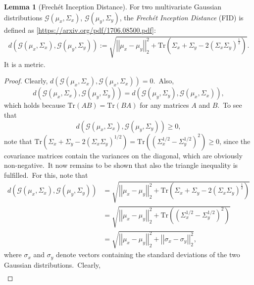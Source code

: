 \documentclass[12pt, a4paper]{article}
\numberwithin{equation}{section}
\theoremstyle{definition}
\theoremstyle{definition}
\newtheorem{lemma}[thm]{Lemma} %
\begin{document}
	\begin{lemma}[Frechét Inception Distance]
		For two multivariate Gaussian distributions $\mathcal G(\mu_{x}, \Sigma_{x})$, $\mathcal G(\mu_{y}, \Sigma_{y})$, the \textit{Frechét Inception Distance} (FID) is defined as [\url{https://arxiv.org/pdf/1706.08500.pdf}]: 
		\begin{align}
			d\left(\mathcal G(\mu_{x}, \Sigma_{x}), \mathcal G(\mu_{y}, \Sigma_{y})\right) := \sqrt{\left\vert\left\vert \mu_{x} - \mu_{y} \right\vert\right\vert_{2}^{2} + \text{Tr}\left(\Sigma_{x} + \Sigma_{y} - 2\left(\Sigma_{x}\Sigma_{y}\right)^{\frac{1}{2}}\right)}. 
		\end{align}
		It is a metric.\
	\end{lemma}
	\begin{proof}
		Clearly, $d\left(\mathcal G(\mu_{x}, \Sigma_{x}), \mathcal G(\mu_{x}, \Sigma_{x})\right) = 0$.\ Also, $$d\left(\mathcal G(\mu_{x}, \Sigma_{x}), \mathcal G(\mu_{y}, \Sigma_{y})\right) = d\left(\mathcal G(\mu_{y}, \Sigma_{y}), \mathcal G(\mu_{x}, \Sigma_{x})\right),$$ which holds because $\text{Tr}(AB) = \text{Tr}(BA)$ for any matrices $A$ and $B$.\ To see that $$d\left(\mathcal G(\mu_{x}, \Sigma_{x}), \mathcal G(\mu_{y}, \Sigma_{y})\right) \geq 0,$$ note that $\text{Tr}(\Sigma_{x} + \Sigma_{y} - 2\left(\Sigma_{x}\Sigma_{y}\right)^{1/2}) = \text{Tr}\left(\left(\Sigma_{x}^{1/2} - \Sigma_{y}^{1/2}\right)^{2}\right) \geq 0$, since the covariance matrices contain the variances on the diagonal, which are obviously non-negative.\ It now remains to be shown that also the triangle inequality is fulfilled.\ For this, note that 
		\begin{align}
			d\left(\mathcal G(\mu_{x}, \Sigma_{x}), \mathcal G(\mu_{y}, \Sigma_{y})\right) &= \sqrt{\left\vert\left\vert \mu_{x} - \mu_{y} \right\vert\right\vert_{2}^{2} + \text{Tr}\left(\Sigma_{x} + \Sigma_{y} - 2\left(\Sigma_{x}\Sigma_{y}\right)^{\frac{1}{2}}\right)} 
			\\ &= \sqrt{\left\vert\left\vert \mu_{x} - \mu_{y} \right\vert\right\vert_{2}^{2} + \text{Tr}\left(\left(\Sigma_{x}^{1/2} - \Sigma_{y}^{1/2}\right)^{2}\right)}
			\\ &= \sqrt{\left\vert\left\vert \mu_{x} - \mu_{y} \right\vert\right\vert_{2}^{2} + \left\vert\left\vert \sigma_{x} - \sigma_{y}\right\vert\right\vert_{2}^{2}}, 
		\end{align}
		where $\sigma_{x}$ and $\sigma_{y}$ denote vectors containing the standard deviations of the two Gaussian distributions.\ Clearly, 
		\begin{align}

\end{align}
\end{proof}
\end{document}
